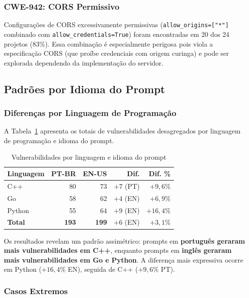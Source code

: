 \documentclass[12pt]{article}
\begin{document}
\subsubsection{CWE-942: CORS Permissivo}

Configurações de CORS excessivamente permissivas (\texttt{allow\_origins=["*"]} combinado com \texttt{allow\_credentials=True}) foram encontradas em 20 dos 24 projetos (83\%). Essa combinação é especialmente perigosa pois viola a especificação CORS (que proíbe credenciais com origem curinga) e pode ser explorada dependendo da implementação do servidor.

\subsection{Padrões por Idioma do Prompt}

\subsubsection{Diferenças por Linguagem de Programação}

A Tabela~\ref{tab:por_linguagem} apresenta os totais de vulnerabilidades desagregados por linguagem de programação e idioma do prompt.

\begin{table}[H]
\centering
\caption{Vulnerabilidades por linguagem e idioma do prompt}
\label{tab:por_linguagem}
\begin{tabular}{lrrrr}
\toprule
\textbf{Linguagem} & \textbf{PT-BR} & \textbf{EN-US} & \textbf{Dif.} & \textbf{Dif. \%} \\
\midrule
C++    & 80 & 73 & $+7$ (PT) & $+9,6\%$ \\
Go     & 58 & 62 & $+4$ (EN) & $+6,9\%$ \\
Python & 55 & 64 & $+9$ (EN) & $+16,4\%$ \\
\midrule
\textbf{Total} & \textbf{193} & \textbf{199} & $+6$ (EN) & $+3,1\%$ \\
\bottomrule
\end{tabular}
\end{table}

Os resultados revelam um padrão assimétrico: prompts em \textbf{português geraram mais vulnerabilidades em C++}, enquanto prompts em \textbf{inglês geraram mais vulnerabilidades em Go e Python}. A diferença mais expressiva ocorre em Python ($+16,4\%$ EN), seguida de C++ ($+9,6\%$ PT).

\subsubsection{Casos Extremos}
\end{document}
